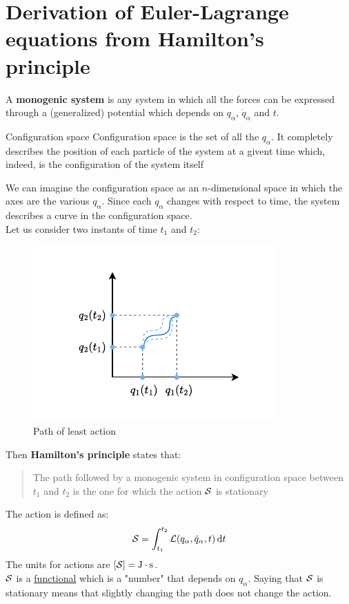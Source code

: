 \section{Derivation of Euler-Lagrange equations from Hamilton's principle}
A \textbf{monogenic system} is any system in which all the forces can be expressed through a (generalized) potential which depends on $q_{\alpha}$, $\dot{q}_{\alpha}$ and $t$.
\begin{definition}{Configuration space}
  Configuration space is the set of all the $q_{\alpha}$. It completely describes the position of each particle of the system at a givent time which, indeed, is the configuration of the system itself
\end{definition}
We can imagine the configuration space as an $n$-dimensional space in which the axes are the various $q_{\alpha}$.
Since each $q_{\alpha}$ changes with respect to time, the system describes a curve in the configuration space.\\
Let us consider two instants of time $t_1$ and $t_2$:
\begin{figure}[H]
    \centering
    \includegraphics[width=0.6\linewidth]{res/svg/leastactionpath.drawio}
    \caption{Path of least action}
    \label{fig:image9}
\end{figure}
Then \textbf{Hamilton's principle} states that:
\begin{quote} \label{q:Hamilton_principle_quote} %
    The path followed by a monogenic system in configuration space between $t_1$ and $t_2$ is the one for which the action $\mathcal{S}$ is stationary
\end{quote}
The action is defined as:
\begin{equation}
    \mathcal{S} = \int_{t_1}^{t_2}\mathcal{L}(q_{\alpha},\dot{q}_{\alpha},t) \dd{t}
\end{equation}
The units for actions are $[\mathcal{S}] = \mathrm{J\cdot s}$.\\ $\mathcal{S}$ is a \underline{functional} which is a "number" that depends on $q_{\alpha}$. Saying that $\mathcal{S}$ is stationary means that slightly changing the path does not change the action.\\
